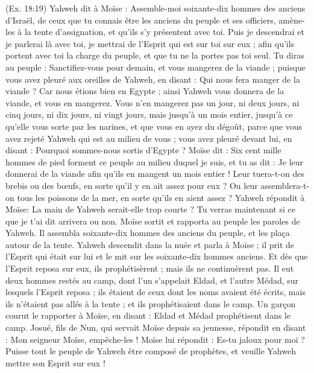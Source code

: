 \begin{multicols}{2}
{(Ex. 18:19)}
Yahweh dit à Moïse : Assemble-moi soixante-dix hommes des anciens d'Israël, de ceux que tu connais être les anciens du peuple et ses officiers, amène-les à la tente d'assignation, et qu'ils s’y présentent avec toi.
Puis je descendrai et je parlerai là avec toi, je mettrai de l'Esprit qui est sur toi sur eux ; afin qu'ils portent avec toi la charge du peuple, et que tu ne la portes pas toi seul.
Tu diras au peuple : Sanctifiez-vous pour demain, et vous mangerez de la viande ; puisque vous avez pleuré aux oreilles de Yahweh, en disant : Qui nous fera manger de la viande ? Car nous étions bien en Egypte ; ainsi Yahweh vous donnera de la viande, et vous en mangerez.
Vous n'en mangerez pas un jour, ni deux jours, ni cinq jours, ni dix jours, ni vingt jours,
mais jusqu'à un mois entier, jusqu'à ce qu'elle vous sorte par les narines, et que vous en ayez du dégoût, parce que vous avez rejeté Yahweh qui est au milieu de vous ; vous avez pleuré devant lui, en disant : Pourquoi sommes-nous sortis d'Egypte ?
Moïse dit : Six cent mille hommes de pied forment ce peuple au milieu duquel je suis, et tu as dit : Je leur donnerai de la viande afin qu'ils en mangent un mois entier !
Leur tuera-t-on des brebis ou des bœufs, en sorte qu'il y en ait assez pour eux ? Ou leur assemblera-t-on tous les poissons de la mer, en sorte qu'ils en aient assez ?
Yahweh répondit à Moïse: La main de Yahweh serait-elle trop courte ? Tu verras maintenant si ce que je t'ai dit arrivera ou non.
Moïse sortit et rapporta au peuple les paroles de Yahweh. Il assembla soixante-dix hommes des anciens du peuple, et les plaça autour de la tente.
Yahweh descendit dans la nuée et parla à Moïse ; il prit de l'Esprit qui était sur lui et le mit sur les soixante-dix hommes anciens. Et dès que l'Esprit reposa sur eux, ils prophétisèrent ; mais ils ne continuèrent pas.
Il eut deux hommes restés au camp, dont l'un s'appelait Eldad, et l'autre Médad, sur lesquels l'Esprit reposa ; ils étaient de ceux dont les noms avaient été écrits, mais ils n'étaient pas allés à la tente ; et ils prophétisaient dans le camp.
Un garçon courut le rapporter à Moïse, en disant : Eldad et Médad prophétisent dans le camp.
Josué, fils de Nun, qui servait Moïse depuis sa jeunesse, répondit en disant : Mon seigneur Moïse, empêche-les !
Moïse lui répondit : Es-tu jaloux pour moi ? Puisse tout le peuple de Yahweh être composé de prophètes, et veuille Yahweh mettre son Esprit sur eux !

\end{multicols}
